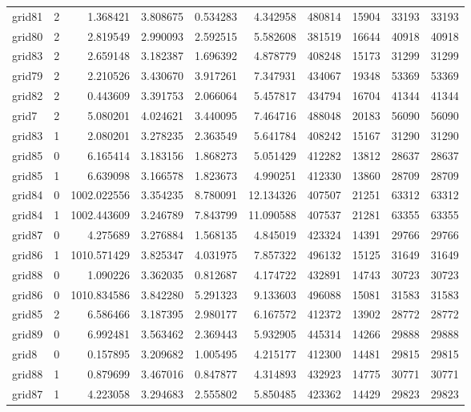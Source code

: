 \begin{longtable}{|l|r|r|r|r|r|r|r|r|r|}
grid81 & 2 & 1.368421 & 3.808675 & 0.534283 & 4.342958 & 480814 & 15904 & 33193 & 33193 \\
grid80 & 2 & 2.819549 & 2.990093 & 2.592515 & 5.582608 & 381519 & 16644 & 40918 & 40918 \\
grid83 & 2 & 2.659148 & 3.182387 & 1.696392 & 4.878779 & 408248 & 15173 & 31299 & 31299 \\
grid79 & 2 & 2.210526 & 3.430670 & 3.917261 & 7.347931 & 434067 & 19348 & 53369 & 53369 \\
grid82 & 2 & 0.443609 & 3.391753 & 2.066064 & 5.457817 & 434794 & 16704 & 41344 & 41344 \\
grid7 & 2 & 5.080201 & 4.024621 & 3.440095 & 7.464716 & 488048 & 20183 & 56090 & 56090 \\
grid83 & 1 & 2.080201 & 3.278235 & 2.363549 & 5.641784 & 408242 & 15167 & 31290 & 31290 \\
grid85 & 0 & 6.165414 & 3.183156 & 1.868273 & 5.051429 & 412282 & 13812 & 28637 & 28637 \\
grid85 & 1 & 6.639098 & 3.166578 & 1.823673 & 4.990251 & 412330 & 13860 & 28709 & 28709 \\
grid84 & 0 & 1002.022556 & 3.354235 & 8.780091 & 12.134326 & 407507 & 21251 & 63312 & 63312 \\
grid84 & 1 & 1002.443609 & 3.246789 & 7.843799 & 11.090588 & 407537 & 21281 & 63355 & 63355 \\
grid87 & 0 & 4.275689 & 3.276884 & 1.568135 & 4.845019 & 423324 & 14391 & 29766 & 29766 \\
grid86 & 1 & 1010.571429 & 3.825347 & 4.031975 & 7.857322 & 496132 & 15125 & 31649 & 31649 \\
grid88 & 0 & 1.090226 & 3.362035 & 0.812687 & 4.174722 & 432891 & 14743 & 30723 & 30723 \\
grid86 & 0 & 1010.834586 & 3.842280 & 5.291323 & 9.133603 & 496088 & 15081 & 31583 & 31583 \\
grid85 & 2 & 6.586466 & 3.187395 & 2.980177 & 6.167572 & 412372 & 13902 & 28772 & 28772 \\
grid89 & 0 & 6.992481 & 3.563462 & 2.369443 & 5.932905 & 445314 & 14266 & 29888 & 29888 \\
grid8 & 0 & 0.157895 & 3.209682 & 1.005495 & 4.215177 & 412300 & 14481 & 29815 & 29815 \\
grid88 & 1 & 0.879699 & 3.467016 & 0.847877 & 4.314893 & 432923 & 14775 & 30771 & 30771 \\
grid87 & 1 & 4.223058 & 3.294683 & 2.555802 & 5.850485 & 423362 & 14429 & 29823 & 29823 \\

\end{longtable}
